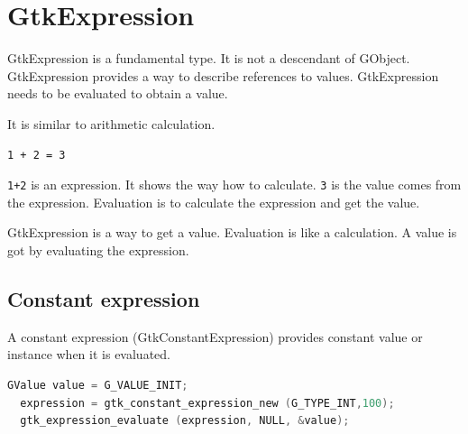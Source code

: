 \section{GtkExpression}\label{gtkexpression}

GtkExpression is a fundamental type. It is not a descendant of GObject.
GtkExpression provides a way to describe references to values.
GtkExpression needs to be evaluated to obtain a value.

It is similar to arithmetic calculation.

\begin{lstlisting}
1 + 2 = 3
\end{lstlisting}

\passthrough{\lstinline!1+2!} is an expression. It shows the way how to
calculate. \passthrough{\lstinline!3!} is the value comes from the
expression. Evaluation is to calculate the expression and get the value.

GtkExpression is a way to get a value. Evaluation is like a calculation.
A value is got by evaluating the expression.

\subsection{Constant expression}\label{constant-expression}

A constant expression (GtkConstantExpression) provides constant value or
instance when it is evaluated.

\begin{lstlisting}[language=C]
  GValue value = G_VALUE_INIT;
  expression = gtk_constant_expression_new (G_TYPE_INT,100);
  gtk_expression_evaluate (expression, NULL, &value);
\end{lstlisting}

